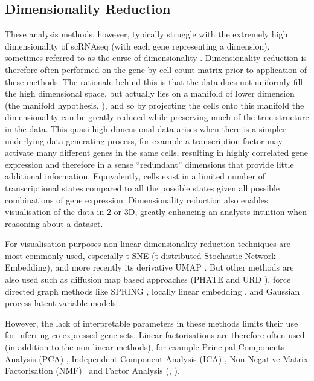 \subsection{Dimensionality Reduction}

These analysis methods, however, typically struggle with the extremely high dimensionality of scRNAseq (with each gene representing a dimension), sometimes referred to as the curse of dimensionality \parencite{Donoho2000HighDimensional}. Dimensionality reduction is therefore often performed on the gene by cell count matrix prior to application of these methods. The rationale behind this is that the data does not uniformly fill the high dimensional space, but actually lies on a manifold of lower dimension (the manifold hypothesis, \cite{Moon2018Manifold}), and so by projecting the cells onto this manifold the dimensionality can be greatly reduced while preserving much of the true structure in the data. This quasi-high dimensional data arises when there is a simpler underlying data generating process, for example a transcription factor may activate many different genes in the same cells, resulting in highly correlated gene expression and therefore in a sense ``redundant'' dimensions that provide little additional information. Equivalently, cells exist in a limited number of transcriptional states compared to all the possible states given all possible combinations of gene expression. Dimensionality reduction also enables visualisation of the data in 2 or 3D, greatly enhancing an analysts intuition when reasoning about a dataset.

For visualisation purposes non-linear dimensionality reduction techniques are most commonly used, especially t-SNE (t-distributed Stochastic Network Embedding), and more recently its derivative UMAP \parencite{McInnes2018UMAP,Becht2019Dimensionality}. But other methods are also used such as diffusion map based approaches (PHATE and URD \cite{Haghverdi2015Diffusion, Moon2019Visualizing, Farrell2018Singlecell}), force directed graph methods like SPRING \parencite{Weinreb2018SPRING, Wagner2018Singlecell}, locally linear embedding \parencite{Welch2016SLICER}, and Gaussian process latent variable models \parencite{Campbell2015Bayesian}.

However, the lack of interpretable parameters in these methods limits their use for inferring co-expressed gene sets. Linear factorisations are therefore often used (in addition to the non-linear methods), for example Principal Components Analysis (PCA) \parencite{Alter2000Singular, Green2018Comprehensive},  Independent Component Analysis (ICA) \parencite{Saunders2018Molecular}, Non-Negative Matrix Factorisation (NMF)~\cite{Brunet2004Metagenes, Kim2003Subsystem, Shao2017Robust, Zhu2017Detecting, Duren2018Integrative, Kotliar2018Identifying, Welch2019SingleCell} and Factor Analysis (\cite{Bernardo2003Bayesian, Buettner2015Computational}, \cite[reviewed in][]{Stein-OBrien2018Enter}).

